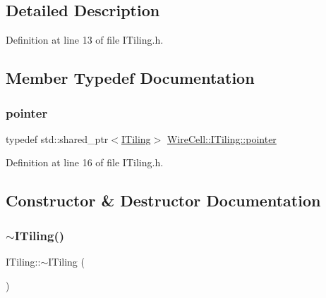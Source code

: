 \subsection{Detailed Description}


Definition at line 13 of file I\+Tiling.\+h.



\subsection{Member Typedef Documentation}
\mbox{\label{class_wire_cell_1_1_i_tiling_a959ba0d53dd41f34e7e12c41801307de}} 
\subsubsection{\texorpdfstring{pointer}{pointer}}
{\footnotesize\ttfamily typedef std\+::shared\+\_\+ptr$<$\hyperlink{class_wire_cell_1_1_i_tiling}{I\+Tiling}$>$ \hyperlink{class_wire_cell_1_1_i_tiling_a959ba0d53dd41f34e7e12c41801307de}{Wire\+Cell\+::\+I\+Tiling\+::pointer}}



Definition at line 16 of file I\+Tiling.\+h.



\subsection{Constructor \& Destructor Documentation}
\mbox{\label{class_wire_cell_1_1_i_tiling_a7bb120957e837b5e82ed0e6861a24235}} 
\subsubsection{\texorpdfstring{$\sim$\+I\+Tiling()}{~ITiling()}}
{\footnotesize\ttfamily I\+Tiling\+::$\sim$\+I\+Tiling (\begin{DoxyParamCaption}{ }\end{DoxyParamCaption})\hspace{0.3cm}{\ttfamily [virtual]}}



